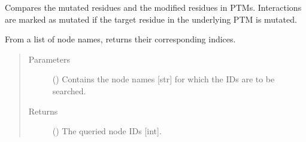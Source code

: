 \documentclass[letterpaper,10pt,english]{sphinxmanual}
\begin{document}
\begin{fulllineitems}

\begin{fulllineitems}
\label{\detokenize{main:pypath.main.PyPath.mutated_edges}}
Compares the mutated residues and the modified residues in PTMs.
Interactions are marked as mutated if the target residue in the
underlying PTM is mutated.

\end{fulllineitems}


\begin{fulllineitems}
\label{\detokenize{main:pypath.main.PyPath.names2vids}}
From a list of node names, returns their corresponding indices.
\begin{quote}\begin{description}
\item[{Parameters}] \leavevmode
{} () \textendash{} Contains the node names {[}str{]} for which the IDs are to be
searched.

\item[{Returns}] \leavevmode
() \textendash{} The queried node IDs {[}int{]}.

\end{description}\end{quote}

\end{fulllineitems}


\begin{fulllineitems}
\label{\detokenize{main:pypath.main.PyPath.negative_report}}
\end{fulllineitems}


\begin{fulllineitems}
\label{\detokenize{main:pypath.main.PyPath.neighborhood}}
\end{fulllineitems}


\end{fulllineitems}
\end{document}
